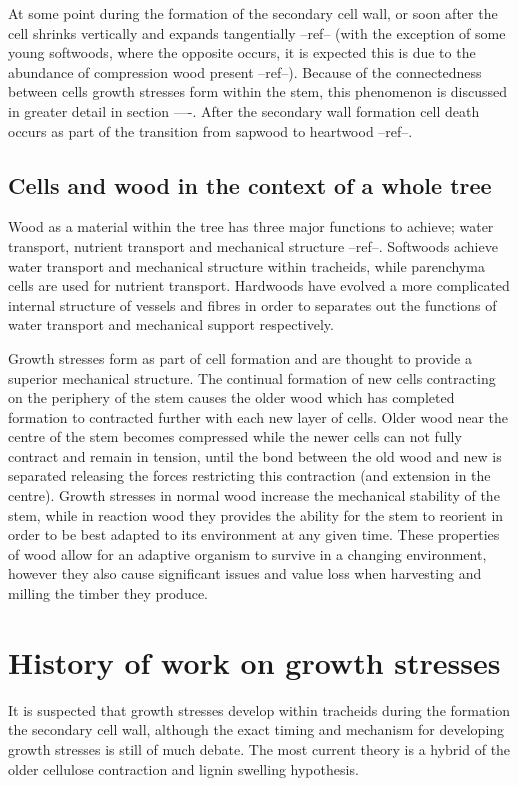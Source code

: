 \documentclass{article}
\begin{document}
At some point during the formation of the secondary cell wall, or soon after the
cell shrinks vertically and expands tangentially --ref-- (with the exception of
some young softwoods, where the opposite occurs, it is expected this is due to
the abundance of compression wood present --ref--). Because of the connectedness
between cells growth stresses form within the stem, this phenomenon is discussed
in greater detail in section ----. After the secondary wall formation cell death
occurs as part of the transition from sapwood to heartwood --ref--.

\subsection{Cells and wood in the context of a whole tree}
Wood as a material within the tree has three major functions to achieve; water
transport, nutrient transport and mechanical structure --ref--. Softwoods
achieve water transport and mechanical structure within tracheids, while
parenchyma cells are used for nutrient transport. Hardwoods have evolved a more
complicated internal structure of vessels and fibres in order to separates out
the functions of water transport and mechanical support respectively.

Growth stresses form as part of cell formation and are thought to provide a
superior mechanical structure. The continual formation of new cells contracting
on the periphery of the stem causes the older wood which has completed formation
to contracted further with each new layer of cells. Older wood near the centre
of the stem becomes compressed while the newer cells can not fully contract and
remain in tension, until the bond between the old wood and new is separated
releasing the forces restricting this contraction (and extension in the centre).
Growth stresses in normal wood increase the mechanical stability of the stem,
while in reaction wood they provides the ability for the stem to reorient in
order to be best adapted to its environment at any given time. These properties
of wood allow for an adaptive organism to survive in a changing environment,
however they also cause significant issues and value loss when harvesting and
milling the timber they produce.


\section{History of work on growth stresses}
It is suspected that growth stresses develop within tracheids during the
formation the secondary cell wall, although the exact timing and mechanism for
developing growth stresses is still of much debate. The most current theory is
a hybrid of the older cellulose contraction and lignin swelling hypothesis.
\end{document}
